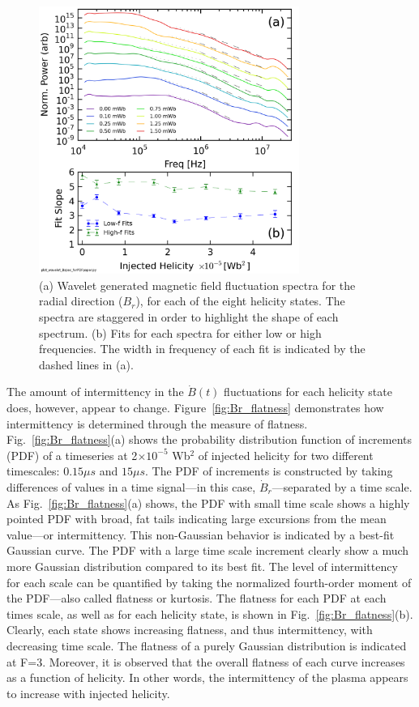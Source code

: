 \documentclass[aip,prl,amsmath,amssymb,reprint,superscriptaddress]{revtex4-1} %
\begin{document}
\begin{figure}[!htbp]
\centerline{
\includegraphics[width=8.5cm]{Br_spectra.png}}
\caption{\label{fig:Br_spectra} (a) Wavelet generated magnetic field fluctuation spectra for the radial direction ($B_{r}$), for each of the eight helicity states. The spectra are staggered in order to highlight the shape of each spectrum. (b) Fits for each spectra for either low or high frequencies. The width in frequency of each fit is indicated by the dashed lines in (a).}
\end{figure}

The amount of intermittency in the $\dot{B}(t)$ fluctuations for each helicity state does, however, appear to change. Figure~\ref{fig:Br_flatness} demonstrates how intermittency is determined through the measure of flatness. Fig.~\ref{fig:Br_flatness}(a) shows the probability distribution function of increments (PDF) of a timeseries at 2$\times 10^{-5}$ Wb$^{2}$ of injected helicity for two different timescales: $0.15\mu s$ and $15\mu s$. The PDF of increments is constructed by taking differences of values in a time signal---in this case, $\dot{B}_{r}$---separated by a time scale. As Fig.~\ref{fig:Br_flatness}(a) shows, the PDF with small time scale shows a highly pointed PDF with broad, fat tails indicating large excursions from the mean value---or intermittency. This non-Gaussian behavior is indicated by a best-fit Gaussian curve. The PDF with a large time scale increment clearly show a much more Gaussian distribution compared to its best fit. The level of intermittency for each scale can be quantified by taking the normalized fourth-order moment of the PDF---also called flatness or kurtosis. The flatness for each PDF at each times scale, as well as for each helicity state, is shown in Fig.~\ref{fig:Br_flatness}(b). Clearly, each state shows increasing flatness, and thus intermittency, with decreasing time scale. The flatness of a purely Gaussian distribution is indicated at F=3. Moreover, it is observed that the overall flatness of each curve increases as a function of helicity. In other words, the intermittency of the plasma appears to increase with injected helicity.
\end{document}

